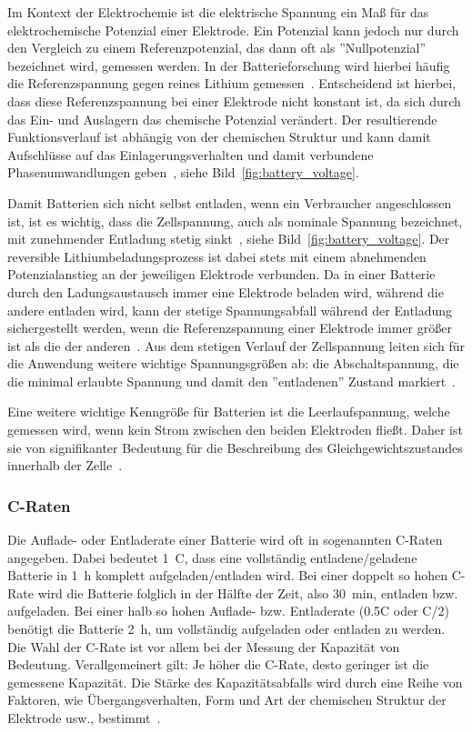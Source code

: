 Im Kontext der Elektrochemie ist die elektrische Spannung ein Maß für das elektrochemische Potenzial einer Elektrode. Ein Potenzial kann jedoch nur durch den Vergleich zu einem Referenzpotenzial, das dann oft als ''Nullpotenzial'' bezeichnet wird, gemessen werden. In der Batterieforschung wird hierbei häufig die Referenzspannung gegen reines Lithium gemessen~\cite{Newman2021}. Entscheidend ist hierbei, dass diese Referenzspannung bei einer Elektrode nicht konstant ist, da sich durch das Ein- und Auslagern das chemische Potenzial verändert. Der resultierende Funktionsverlauf ist abhängig von der chemischen Struktur und kann damit Aufschlüsse auf das Einlagerungsverhalten und damit verbundene Phasenumwandlungen geben~\cite{Plett2015}, siehe Bild~\ref{fig:battery_voltage}.

Damit Batterien sich nicht selbst entladen, wenn ein Verbraucher angeschlossen ist, ist es wichtig, dass die Zellspannung, auch als nominale Spannung bezeichnet, mit zunehmender Entladung stetig sinkt~\cite{Newman2021}, siehe Bild~\ref{fig:battery_voltage}. Der reversible Lithiumbeladungsprozess ist dabei stets mit einem abnehmenden Potenzialanstieg an der jeweiligen Elektrode verbunden. Da in einer Batterie durch den Ladungsaustausch immer eine Elektrode beladen wird, während die andere entladen wird, kann der stetige Spannungsabfall während der Entladung sichergestellt werden, wenn die Referenzspannung einer Elektrode immer größer ist als die der anderen~\cite{Plett2024}. Aus dem stetigen Verlauf der Zellspannung leiten sich für die Anwendung weitere wichtige Spannungsgrößen ab: die Abschaltspannung, die die minimal erlaubte Spannung und damit den ''entladenen'' Zustand markiert~\cite{Plett2015}.

Eine weitere wichtige Kenngröße für Batterien ist die Leerlaufspannung, welche gemessen wird, wenn kein Strom zwischen den beiden Elektroden fließt. Daher ist sie von signifikanter Bedeutung für die Beschreibung des Gleichgewichtszustandes innerhalb der Zelle~\cite{Newman2021}.

\subsubsection*{C-Raten}
Die Auflade- oder Entladerate einer Batterie wird oft in sogenannten C-Raten angegeben. Dabei bedeutet 1~C, dass eine vollständig entladene/geladene Batterie in 1~h komplett aufgeladen/entladen wird. Bei einer doppelt so hohen C-Rate wird die Batterie folglich in der Hälfte der Zeit, also 30~min, entladen bzw. aufgeladen. Bei einer halb so hohen Auflade- bzw. Entladerate (0.5C oder C/2) benötigt die Batterie 2~h, um vollständig aufgeladen oder entladen zu werden. Die Wahl der C-Rate ist vor allem bei der Messung der Kapazität von Bedeutung. Verallgemeinert gilt: Je höher die C-Rate, desto geringer ist die gemessene Kapazität. Die Stärke des Kapazitätsabfalls wird durch eine Reihe von Faktoren, wie Übergangsverhalten, Form und Art der chemischen Struktur der Elektrode usw., bestimmt~\cite{Plett2015,Beard2019}.



